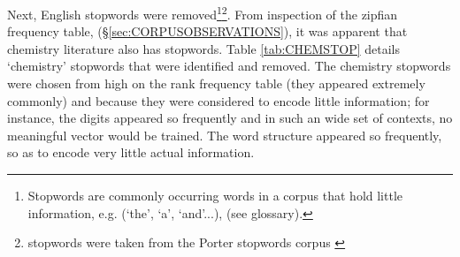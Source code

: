 Next, English stopwords were removed\footnote{Stopwords are commonly occurring words in a corpus that hold little information, e.g. (`the', `a', `and'...), (see glossary).}\footnote{stopwords were taken from the Porter stopwords corpus \cite{nltk}\cite{porter}}. From inspection of the zipfian frequency table, (\S \ref{sec:CORPUSOBSERVATIONS}), it was apparent that chemistry literature also has stopwords. Table \ref{tab:CHEMSTOP} details `chemistry' stopwords that were identified and removed. The chemistry stopwords were chosen from high on the rank frequency table (they appeared extremely commonly) and because they were considered to encode little information; for instance, the digits appeared so frequently and in such an wide set of contexts, no meaningful vector would be trained. The word structure appeared so frequently, so as to encode very little actual information.
%

